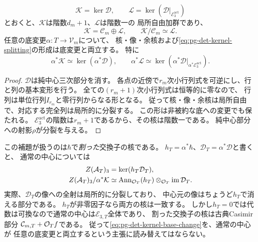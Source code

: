 \begin{lemma}[割った交換子の核と底変更]
\label{lem:pg-det-divided-kernel}
\begin{equation}
 \mathcal K=\ker\mathcal D,\qquad
 \mathcal L=\ker(\mathcal D|_{\mathcal E_3^{\mathrm{act}}})
 \label{eq:pg-det-kernel-line}
\end{equation}
とおくと、$\mathcal K$は階数$d_m+1$、$\mathcal L$は階数一の
局所自由加群であり、
\begin{equation}
 \mathcal K=\mathcal C_m\oplus\mathcal L,
 \qquad \mathcal K/\mathcal C_m\simeq\mathcal L.
 \label{eq:pg-det-kernel-splitting}
\end{equation}
任意の底変更$\alpha:T\to\mathcal V_m$について、
核・像・余核および\eqref{eq:pg-det-kernel-splitting}の形成は底変更と両立する。
特に
\begin{equation}
 \alpha^*\mathcal K\simeq\ker(\alpha^*\mathcal D),
 \qquad
 \alpha^*\mathcal L\simeq
 \ker(\alpha^*\mathcal D|_{\alpha^*\mathcal E_3^{\mathrm{act}}}).
 \label{eq:pg-det-kernel-base-change}
\end{equation}
\end{lemma}
\begin{proof}
$\mathcal D$は純中心三次部分を消す。
各点の近傍で$r_m$次小行列式を可逆にし、行と列の基本変形を行う。
全ての$(r_m+1)$次小行列式は恒等的に零なので、
行列は単位行列$I_{r_m}$と零行列からなる形となる。
従って核・像・余核は局所自由で、対応する完全列は局所的に分裂する。
この形は非被約な底への変更でも保たれる。
$\mathcal E_3^{\mathrm{act}}$の階数は$r_m+1$であるから、その核は階数一である。
純中心部分への射影$\rho$が分裂を与える。
\end{proof}

\begin{remark}[通常の中心の形成との区別]
\label{rem:pg-det-center-base-change}
この補題が扱うのは$\hbar$で\emph{割った}交換子の核である。
$h_T=\alpha^*\hbar$、$\mathcal D_T=\alpha^*\mathcal D$と書くと、
通常の中心については
\begin{equation}
 \begin{aligned}
 Z(\mathcal A_T)_3&=\ker(h_T\mathcal D_T),\\
 Z(\mathcal A_T)_3/\alpha^*\mathcal K
 &\simeq
 \operatorname{Ann}_{\mathcal O_T}(h_T)
 \otimes_{\mathcal O_T}\operatorname{im}\mathcal D_T.
 \end{aligned}
 \label{eq:pg-det-ordinary-center-base-change}
\end{equation}
実際、$\mathcal D_T$の像への全射は局所的に分裂しており、
中心元の像はちょうど$h_T$で消える部分である。
$h_T$が非零因子なら両方の核は一致する。
しかし$h_T=0$では代数は可換なので通常の中心は$\mathcal E_{3,T}$全体であり、
割った交換子の核は古典Casimir部分
$\mathcal C_{m,T}+\mathcal O_T f$である。
従って\eqref{eq:pg-det-kernel-base-change}を、通常の中心が
任意の底変更と両立するという主張に読み替えてはならない。
\end{remark}


